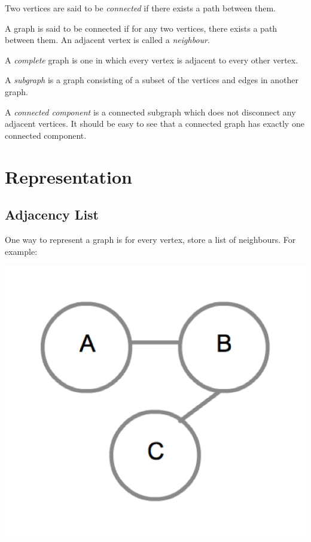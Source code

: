 Two vertices are said to be \emph{connected} if there exists a path
between them.  

A graph is said to be connected if for any two vertices, there exists
a path between them. An adjacent vertex is called a \emph{neighbour}.

A \emph{complete} graph is one in which every vertex is adjacent to
every other vertex.

A \emph{subgraph} is a graph consisting of a subset of the vertices
and edges in another graph.

A \emph{connected component} is a connected subgraph which does
not disconnect any adjacent vertices.  It should be easy to see that a
connected graph has exactly one connected component.

\section{Representation}

\subsection{Adjacency List}

One way to represent a graph is for every vertex, store a list of
neighbours.  For example:

{
  \includegraphics[scale=0.2]{SimpleGraph}
  \label{fig:SimpleGraph}
}

